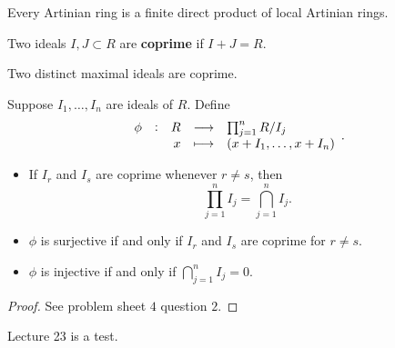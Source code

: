 \begin{theorem}
\label{thm:13.16}
Every Artinian ring is a finite direct product of local Artinian rings.
\end{theorem}

\begin{definition}
Two ideals $ I, J \subset R $ are \textbf{coprime} if $ I + J = R $.
\end{definition}

\begin{example*}
Two distinct maximal ideals are coprime.
\end{example*}

Suppose $ I_1, \dots, I_n $ are ideals of $ R $. Define
$$ \function[\phi]{R}{\prod_{j = 1}^n R / I_j}{x}{\br{x + I_1, \dots, x + I_n}}. $$

\begin{lemma}
\label{lem:13.18}
\hfill
\begin{itemize}
\item If $ I_r $ and $ I_s $ are coprime whenever $ r \ne s $, then
$$ \prod_{j = 1}^n I_j = \bigcap_{j = 1}^n I_j. $$
\item $ \phi $ is surjective if and only if $ I_r $ and $ I_s $ are coprime for $ r \ne s $.
\item $ \phi $ is injective if and only if $ \bigcap_{j = 1}^n I_j = 0 $.
\end{itemize}
\end{lemma}

\begin{proof}
See problem sheet $ 4 $ question $ 2 $.
\end{proof}


Lecture 23 is a test.


